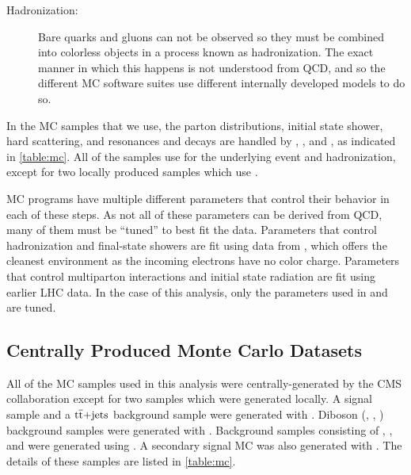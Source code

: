 \begin{description}
    \item[Hadronization:] Bare quarks and gluons can not be observed so they
        must be combined into colorless objects in a process known as
        hadronization. The exact manner in which this happens is not understood
        from QCD, and so the different MC software suites use different
        internally developed models to do so.


\end{description}

In the MC samples that we use, the parton distributions, initial state shower,
hard scattering, and resonances and decays are handled by \MADGRAPH
{} \cite{alwall2014}, \POWHEG
\cite{nason2004,alioli2010,re2011}, and \PYTHIAsix {}
\cite{sjostran2006}, as indicated in \cref{table:mc}. All of the samples use
\PYTHIAsix for the underlying event and hadronization, except for two locally
produced samples which use \PYTHIAeight.

MC programs have multiple different parameters that control their behavior in
each of these steps. As not all of these parameters can be derived from QCD,
many of them must be ``tuned'' to best fit the data. Parameters that control
hadronization and final-state showers are fit using data from \LEP, which
offers the cleanest environment as the incoming electrons have no color charge.
Parameters that control multiparton interactions and initial state radiation
are fit using earlier LHC data. In the case of this analysis, only the
parameters used in \PYTHIAsix and \PYTHIAeight are tuned.

\subsection{Centrally Produced Monte Carlo Datasets}
\label{ssec:monte_carlo}

All of the MC samples used in this analysis were centrally-generated by the CMS
collaboration except for two \POWHEG \DYtoee samples which were generated
locally. A \DYtoll signal sample and a $\text{t} \overline{\text{t}}\text{+jets}$ background sample
were generated with \MADGRAPH. Diboson (\ZZ, \WZ, \WW) background samples were
generated with \PYTHIAsix. Background samples consisting of \tbarW, \tW, and
\DYtotautau were generated using \POWHEG. A secondary signal MC was also
generated with \POWHEG. The details of these samples are listed in
\cref{table:mc}.

